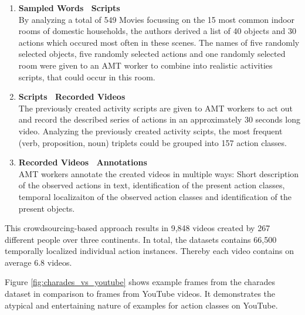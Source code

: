 \begin{enumerate}
    \item \textbf{Sampled Words \textrightarrow\  Scripts}\\
    By analyzing a total of 549 Movies focussing on the 15 most common indoor rooms of domestic households, the authors derived a list of 40 objects and 30 actions which occured most often in these scenes. The names of five randomly selected objects, five randomly selected actions and one randomly selected room were given to an AMT worker to combine into realistic activities scripts, that could occur in this room.
\item \textbf{Scripts \textrightarrow\  Recorded Videos}\\
    The previously created activity scripts are given to AMT workers to act out and record the described series of actions in an approximately 30 seconds long video. Analyzing the previously created activity scipts, the most frequent (verb, proposition, noun) triplets could be grouped into 157 action classes.
\item \textbf{Recorded Videos \textrightarrow\  Annotations}\\
    AMT workers annotate the created videos in multiple ways: Short description of the observed actions in text, identification of the present action classes, temporal localizaiton of the observed action classes and identification of the present objects.
\end{enumerate}

This crowdsourcing-based approach results in 9,848 videos created by 267 different people over three continents.
In total, the datasets contains 66,500 temporally localized individual action instances.
Thereby each video contains on average 6.8 videos.

Figure \ref{fig:charades_vs_youtube} shows example frames from the charades dataset in comparison to frames from YouTube videos.
It demonstrates the atypical and entertaining nature of examples for action classes on YouTube.

